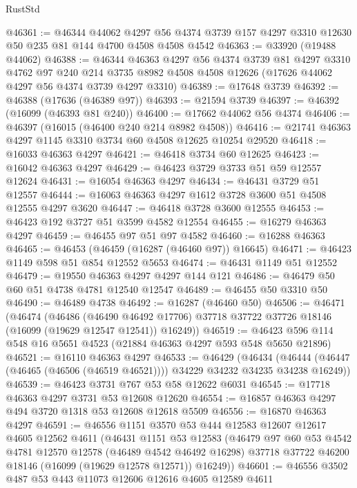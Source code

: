 \begin{lexlean}{RustStd}
\begin{coremodule}
@46361 := @46344
    @44062
    @4297
    @56
    @4374
    @3739
    @157
    @4297
    @3310
    @12630
    @50
    @235
    @81
    @144
    @4700
    @4508
    @4508
    @4542
@46363 := @33920 (@19488 @44062)
@46388 := @46344
    @46363
    @4297
    @56
    @4374
    @3739
    @81
    @4297
    @3310
    @4762
    @97
    @240
    @214
    @3735
    @8982
    @4508
    @4508
    @12626
    (@17626 @44062 @4297 @56 @4374 @3739 @4297 @3310)
@46389 := @17648 @3739
@46392 := @46388 (@17636 (@46389 @97))
@46393 := @21594 @3739
@46397 := @46392 (@16099 (@46393 @81 @240))
@46400 := @17662 @44062 @56 @4374
@46406 := @46397 (@16015 (@46400 @240 @214 @8982 @4508))
@46416 := @21741 @46363 @4297 @1145 @3310 @3734 @60 @4508 @12625 @10254 @29520
@46418 := @16033 @46363 @4297
@46421 := @46418 @3734 @60 @12625
@46423 := @16042 @46363 @4297
@46429 := @46423 @3729 @3733 @51 @59 @12557 @12624
@46431 := @16054 @46363 @4297
@46434 := @46431 @3729 @51 @12557
@46444 := @16063 @46363 @4297 @1612 @3728 @3600 @51 @4508 @12555 @4297 @3620
@46447 := @46418 @3728 @3600 @12555
@46453 := @46423 @192 @3727 @51 @3599 @4582 @12554
@46455 := @16279 @46363 @4297
@46459 := @46455 @97 @51 @97 @4582
@46460 := @16288 @46363
@46465 := @46453 (@46459 (@16287 (@46460 @97)) @16645)
@46471 := @46423 @1149 @598 @51 @854 @12552 @5653
@46474 := @46431 @1149 @51 @12552
@46479 := @19550 @46363 @4297 @4297 @144 @121
@46486 := @46479 @50 @60 @51 @4738 @4781 @12540 @12547
@46489 := @46455 @50 @3310 @50
@46490 := @46489 @4738
@46492 := @16287 (@46460 @50)
@46506 := @46471
    (@46474
      (@46486
        (@46490 @46492 @17706)
        @37718
        @37722
        @37726
        @18146
        (@16099 (@19629 @12547 @12541))
        @16249))
@46519 := @46423 @596 @114 @548 @16 @5651 @4523 (@21884 @46363 @4297 @593 @548 @5650 @21896)
@46521 := @16110 @46363 @4297
@46533 := @46429
    (@46434 (@46444 (@46447 (@46465 (@46506 (@46519 @46521)))) @34229 @34232 @34235 @34238 @16249))
@46539 := @46423 @3731 @767 @53 @58 @12622 @6031
@46545 := @17718 @46363 @4297 @3731 @53 @12608 @12620
@46554 := @16857 @46363 @4297 @494 @3720 @1318 @53 @12608 @12618 @5509
@46556 := @16870 @46363 @4297
@46591 := @46556
    @1151
    @3570
    @53
    @444
    @12583
    @12607
    @12617
    @4605
    @12562
    @4611
    (@46431
      @1151
      @53
      @12583
      (@46479
        @97
        @60
        @53
        @4542
        @4781
        @12570
        @12578
        (@46489 @4542 @46492 @16298)
        @37718
        @37722
        @46200
        @18146
        (@16099 (@19629 @12578 @12571))
        @16249))
@46601 := @46556 @3502 @487 @53 @443 @11073 @12606 @12616 @4605 @12589 @4611

\end{coremodule}
\end{lexlean}
